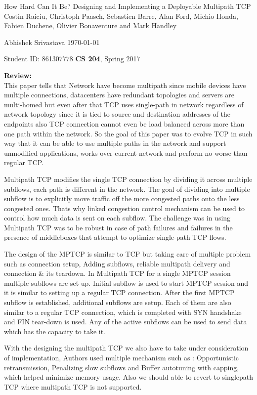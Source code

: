 \documentclass[a4paper,12pt, twoside]{article}
\renewcommand{\maketitle}{%
 	\Large
 	\begin{center}
 	How Hard Can It Be? Designing and Implementing a Deployable Multipath TCP\\	
 	\normalsize Costin Raiciu, Christoph Paasch,  Sebastien Barre, Alan Ford, Michio Honda, Fabien Duchene,  Olivier Bonaventure and Mark Handley
 	\end{center}
 
 	\Large
	Abhishek Srivastava
	\hfill
	\normalsize
	\today
 	\par
 	Student ID: 861307778
 	\hfill
 	\textbf{CS 204}, Spring 2017
 	\par 	
 	\hrulefill
 	\par
 	}
\begin{document}
\thispagestyle{empty}
	
\maketitle

\textbf{Review:}\\
This paper tells that Network have become multipath since mobile devices have multiple connections, datacenters have redundant topologies and servers are multi-homed but even after that TCP uses single-path in network regardless of network topology since it is tied to source and destination addresses of the endpoints also TCP connection cannot even be load balanced across more than one path within the network. So the goal of this paper was to evolve TCP in such way that it can be able to use multiple paths in the network and support unmodified applications, works over current network and perform no worse than regular TCP.  


Multipath TCP modifies the single TCP connection by dividing it across multiple subflows, each path is different in the network. The goal of dividing into multiple subflow is to explicitly move traffic off the more congested paths onto the less congested ones. Thats why linked congestion control mechanism can be used to control how much data is sent on each subflow. The challenge was in using Multipath TCP was to be robust in case of path failures and failures in the presence of middleboxes that attempt to optimize single-path TCP flows.

The design of the MPTCP is similar to TCP but taking care of multiple problem such as connection setup, Adding subflows, reliable multipath delivery and connection \& its teardown. In Multipath TCP for a single MPTCP session multiple subflows are set up. Initial subflow is used to start MPTCP session and it is similar to setting up a regular TCP connection. After the first MPTCP subflow is established, additional subflows are setup. Each of them are also similar to a regular TCP connection, which is completed with SYN handshake and FIN tear-down is used. Any of the active subflows can be used to send data which has the capacity to take it.

With the designing the multipath TCP we also have to take under consideration of implementation, Authors used multiple mechanism such as : Opportunistic retransmission, Penalizing slow subflows and  Buffer autotuning with capping, which helped minimize memory usage. Also we should able to revert to singlepath TCP where multipath TCP is not supported.\\
\end{document}
